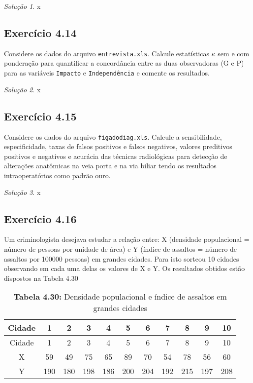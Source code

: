 \documentclass[
]{latex/krantz}
\theoremstyle{definition}
\theoremstyle{definition}
\theoremstyle{definition}
\theoremstyle{definition}
\theoremstyle{remark}
\newtheorem*{solution}{Solução}
\begin{document}
\begin{solution}
x
\end{solution}

\hypertarget{exr4-14}{%
\subsection*{Exercício 4.14}\label{exr4-14}}

Considere os dados do arquivo \texttt{entrevista.xls}. Calcule estatísticas \(\kappa\) sem e com ponderação para quantificar a concordância entre as duas observadoras (G e P) para as variáveis \texttt{Impacto} e \texttt{Independência} e comente os resultados.

\begin{solution}
x
\end{solution}

\hypertarget{exr4-15}{%
\subsection*{Exercício 4.15}\label{exr4-15}}

Considere os dados do arquivo \texttt{figadodiag.xls}. Calcule a sensibilidade, especificidade, taxas de falsos positivos e falsos negativos, valores preditivos positivos e negativos e acurácia das técnicas radiológicas para detecção de alterações anatômicas na veia porta e na via biliar tendo os resultados intraoperatórios como padrão ouro.

\begin{solution}
x
\end{solution}

\hypertarget{exr4-16}{%
\subsection*{Exercício 4.16}\label{exr4-16}}

Um criminologista desejava estudar a relação entre: X (densidade populacional = número de pessoas por unidade de área) e Y (índice de assaltos = número de assaltos por 100000 pessoas) em grandes cidades. Para isto sorteou 10 cidades observando em cada uma delas os valores de X e Y. Os resultados obtidos estão dispostos na Tabela 4.30

\begin{longtable}[]{@{}ccccccccccc@{}}
\caption{\textbf{Tabela 4.30:} Densidade populacional e índice de assaltos em grandes cidades}\tabularnewline
\toprule\noalign{}
Cidade & 1 & 2 & 3 & 4 & 5 & 6 & 7 & 8 & 9 & 10 \\
\midrule\noalign{}
\endfirsthead
\toprule\noalign{}
Cidade & 1 & 2 & 3 & 4 & 5 & 6 & 7 & 8 & 9 & 10 \\
\midrule\noalign{}
\endhead
\bottomrule\noalign{}
\endlastfoot
X & 59 & 49 & 75 & 65 & 89 & 70 & 54 & 78 & 56 & 60 \\
Y & 190 & 180 & 198 & 186 & 200 & 204 & 192 & 215 & 197 & 208 \\
\end{longtable}
\end{document}
